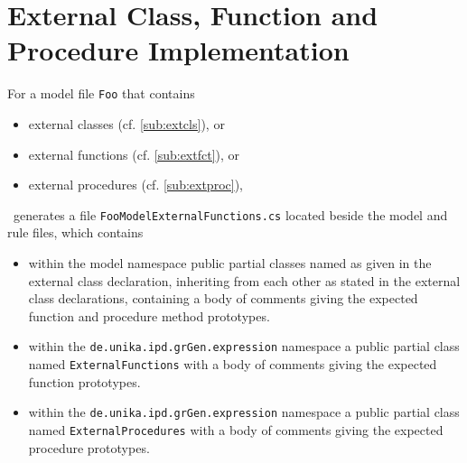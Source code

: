 \section{External Class, Function and Procedure Implementation}\label{sub:extclsfctimpl}

For a model file \texttt{Foo} that contains 
\begin{itemize}
	\item external classes (cf. \ref{sub:extcls}), or
	\item external functions (cf. \ref{sub:extfct}), or 
	\item external procedures (cf. \ref{sub:extproc}), 
\end{itemize}
\GrG~generates a file \texttt{FooModelExternalFunctions.cs} located beside the model and rule files, which contains
\begin{itemize}
	\item within the model namespace public partial classes named as given in the external class declaration,
inheriting from each other as stated in the external class declarations, containing a body of comments giving the expected function and procedure method prototypes.
	\item within the \texttt{de.unika.ipd.grGen.expression} namespace a public partial class named \texttt{ExternalFunctions} with a body of comments giving the expected function prototypes.
	\item within the \texttt{de.unika.ipd.grGen.expression} namespace a public partial class named \texttt{ExternalProcedures} with a body of comments giving the expected procedure prototypes.
\end{itemize}


